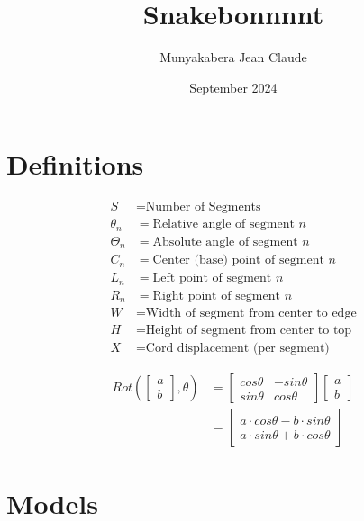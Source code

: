 \documentclass{article}
\title{Snakebonnnnt}
\author{Munyakabera Jean Claude}
\date{September 2024}
\begin{document}
\maketitle

\section{Definitions}

\begin{align*}
    S &= \text{Number of Segments} \\
    \theta_n &= \text{Relative angle of segment } n \\
    \Theta_n &= \text{Absolute angle of segment } n \\
    C_n &= \text{Center (base) point of segment } n \\
    L_n &= \text{Left point of segment } n \\
    R_n &= \text{Right point of segment } n \\
    W &= \text{Width of segment from center to edge} \\
    H &= \text{Height of segment from center to top} \\
    X &= \text{Cord displacement (per segment)}
\end{align*}

\begin{align}
    Rot(\begin{bmatrix} a \\ b \end{bmatrix}, \theta) &= \begin{bmatrix} cos\theta & -sin\theta \\ sin\theta & cos\theta \end{bmatrix} \begin{bmatrix} a \\ b \end{bmatrix} \\
    &= \begin{bmatrix} a\cdot cos\theta - b\cdot sin\theta \\ a\cdot sin\theta + b\cdot cos\theta \end{bmatrix}
\end{align}

\section{Models}
\end{document}

